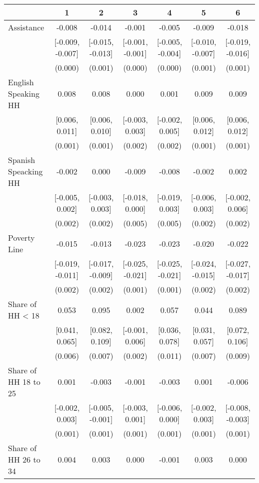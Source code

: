 \begin{table}[H]
\centering\begin{table}[H]
\centering
\begin{tabular}[t]{lcccccc}
\toprule
  & 1 & 2 & 3 & 4 & 5 & 6\\
\midrule
Assistance & -0.008 & -0.014 & -0.001 & -0.005 & -0.009 & -0.018\\
 & [-0.009, -0.007] & [-0.015, -0.013] & [-0.001, -0.001] & [-0.005, -0.004] & [-0.010, -0.007] & [-0.019, -0.016]\\
 & (0.000) & (0.001) & (0.000) & (0.000) & (0.001) & (0.001)\\
English Speaking HH & 0.008 & 0.008 & 0.000 & 0.001 & 0.009 & 0.009\\
 & [0.006, 0.011] & [0.006, 0.010] & [-0.003, 0.003] & [-0.002, 0.005] & [0.006, 0.012] & [0.006, 0.012]\\
 & (0.001) & (0.001) & (0.002) & (0.002) & (0.001) & (0.001)\\
Spanish Speacking HH & -0.002 & 0.000 & -0.009 & -0.008 & -0.002 & 0.002\\
 & [-0.005, 0.002] & [-0.003, 0.003] & [-0.018, 0.000] & [-0.019, 0.003] & [-0.006, 0.003] & [-0.002, 0.006]\\
 & (0.002) & (0.002) & (0.005) & (0.005) & (0.002) & (0.002)\\
Poverty Line & -0.015 & -0.013 & -0.023 & -0.023 & -0.020 & -0.022\\
 & [-0.019, -0.011] & [-0.017, -0.009] & [-0.025, -0.021] & [-0.025, -0.021] & [-0.024, -0.015] & [-0.027, -0.017]\\
 & (0.002) & (0.002) & (0.001) & (0.001) & (0.002) & (0.002)\\
Share of HH < 18 & 0.053 & 0.095 & 0.002 & 0.057 & 0.044 & 0.089\\
 & [0.041, 0.065] & [0.082, 0.109] & [-0.001, 0.006] & [0.036, 0.078] & [0.031, 0.057] & [0.072, 0.106]\\
 & (0.006) & (0.007) & (0.002) & (0.011) & (0.007) & (0.009)\\
Share of HH 18 to 25 & 0.001 & -0.003 & -0.001 & -0.003 & 0.001 & -0.006\\
 & [-0.002, 0.003] & [-0.005, -0.001] & [-0.003, 0.001] & [-0.006, 0.000] & [-0.002, 0.003] & [-0.008, -0.003]\\
 & (0.001) & (0.001) & (0.001) & (0.001) & (0.001) & \vphantom{2} (0.001)\\
Share of HH 26 to 34 & 0.004 & 0.003 & 0.000 & -0.001 & 0.003 & 0.000\\

\end{tabular}
\end{table}
\end{table}
